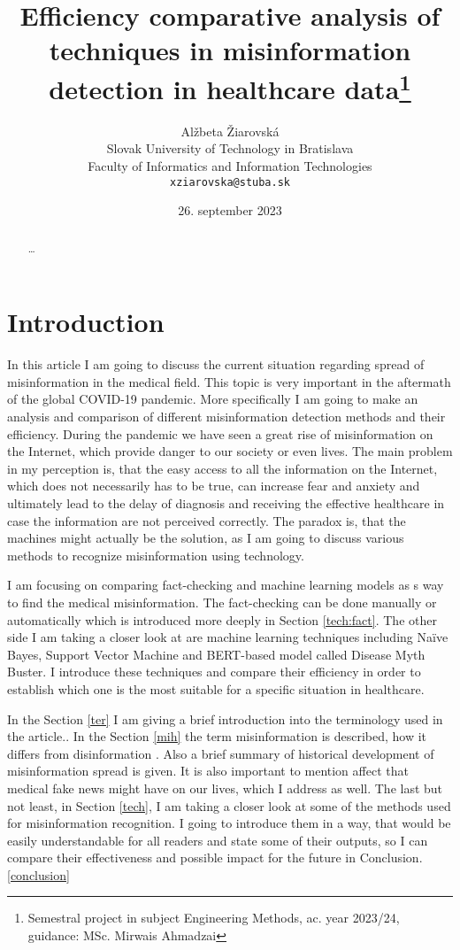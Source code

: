\documentclass[11pt ,english,a4paper]{article}
\title{Efficiency comparative analysis of techniques in misinformation detection in healthcare data\thanks{Semestral project in subject Engineering Methods, ac. year 2023/24, guidance: MSc. Mirwais Ahmadzai}}
\author{Alžbeta Žiarovská\\[2pt]
	{\small Slovak University of Technology in Bratislava}\\
	{\small Faculty of Informatics and Information Technologies}\\
	{\small \texttt{xziarovska@stuba.sk}}
	}
\date{\small 26. september 2023}
\begin{document}
\maketitle
\newpage

\begin{abstract}
\ldots
\end{abstract}
\newpage

\section{Introduction}\label{intro}

In this article I am going to discuss the current situation regarding spread of misinformation in the medical field. This topic is very important in the aftermath of the global COVID-19 pandemic. More specifically I am going to make an analysis and comparison of different misinformation detection methods and their efficiency. During the pandemic we have seen a great rise of misinformation on the Internet, which provide danger to our society or even lives. \cite{war18dr} The main problem in my perception is, that the easy access to all the information on the Internet, which does not necessarily has to be true, can increase fear and anxiety and ultimately lead to the delay of diagnosis and receiving the effective healthcare in case the information are not perceived correctly.\cite{wa19sys} The paradox is, that the machines might actually be the solution, as I am going to discuss various methods to recognize misinformation using technology. \cite{chap22unmask}

I am focusing on comparing fact-checking and machine learning models as s way to find the medical misinformation. The fact-checking can be done manually or automatically which is introduced more deeply in Section \ref{tech:fact}.\cite{bar21health} The other side I am taking a closer look at are machine learning techniques including Naïve Bayes, Support Vector Machine and BERT-based model called Disease Myth Buster.\cite{bar21health}\cite{chap22unmask} I introduce these techniques and compare their efficiency in order to establish which one is the most suitable for a specific situation in healthcare.

In the Section \ref{ter} I am giving a brief introduction into the terminology used in the article.. In the Section \ref{mih} the term misinformation is described, how it differs from disinformation \cite{gu20misinfo}. Also a brief summary of historical development of misinformation spread is given. \cite{pos18short} It is also important to mention affect that medical fake news might have on our lives, which I address as well. \cite{who22infodemics} The last but not least, in Section \ref{tech}, I am taking a closer look at some of the methods used for misinformation recognition. I going to introduce them in a way, that would be easily understandable for all readers and state some of their outputs, so I can compare their effectiveness and possible impact for the future in Conclusion. \ref{conclusion}
\end{document}
